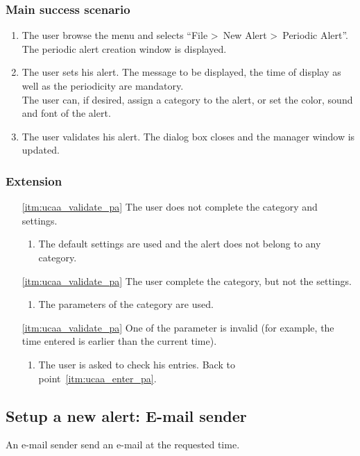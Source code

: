\subsubsection{Main success scenario}
\begin{enumerate}
	\item The user browse the menu and selects ``File \textgreater~New Alert \textgreater~Periodic Alert''. The periodic alert creation window is displayed. 
	\item\label{itm:ucaa_enter_pa} The user sets his alert. The message to be displayed, the time of display as well as the periodicity are mandatory. \\The user can, if desired, assign a category to the alert, or set the color, sound and font of the alert.
	\item\label{itm:ucaa_validate_pa} The user validates his alert. The dialog box closes and the manager window is updated.
\end{enumerate}
\subsubsection{Extension}
\begin{enumerate}
	\item[\ref{itm:ucaa_validate_pa}] The user does not complete the category and settings.
	\begin{enumerate}[i]
		\item The default settings are used and the alert does not belong to any category.
	\end{enumerate}
	\item[\ref{itm:ucaa_validate_pa}] The user complete the category, but not the settings.
	\begin{enumerate}[i]
		\item The parameters of the category are used.
	\end{enumerate}
	\item[\ref{itm:ucaa_validate_pa}] One of the parameter is invalid (for example, the time entered is earlier than the current time).
	\begin{enumerate}[i]
		\item The user is asked to check his entries. Back to point~\ref{itm:ucaa_enter_pa}.
	\end{enumerate}
\end{enumerate}

\subsection{Setup a new alert: E-mail sender}
An e-mail sender send an e-mail at the requested time.
